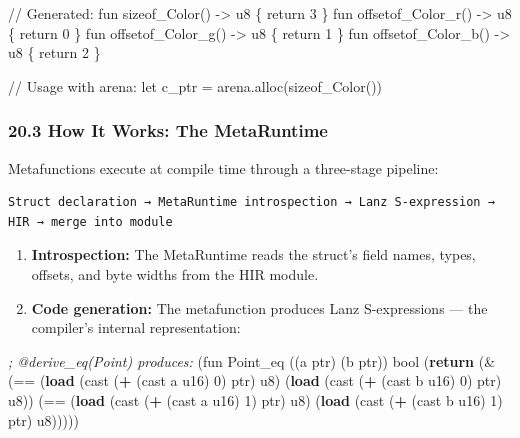 \documentclass[
  11pt,
]{article}
\newenvironment{Shaded}{\begin{snugshade}}{\end{snugshade}}
\newcommand{\CommentTok}[1]{\textcolor[rgb]{0.56,0.35,0.01}{\textit{#1}}}
\newcommand{\DecValTok}[1]{\textcolor[rgb]{0.00,0.00,0.81}{#1}}
\newcommand{\KeywordTok}[1]{\textcolor[rgb]{0.13,0.29,0.53}{\textbf{#1}}}
\newcommand{\NormalTok}[1]{#1}
\newcommand{\OperatorTok}[1]{\textcolor[rgb]{0.81,0.36,0.00}{\textbf{#1}}}
\begin{document}
\begin{Shaded}
\begin{Highlighting}[]
\NormalTok{// Generated:}
\NormalTok{fun sizeof\_Color() {-}\textgreater{} u8 \{ return 3 \}}
\NormalTok{fun offsetof\_Color\_r() {-}\textgreater{} u8 \{ return 0 \}}
\NormalTok{fun offsetof\_Color\_g() {-}\textgreater{} u8 \{ return 1 \}}
\NormalTok{fun offsetof\_Color\_b() {-}\textgreater{} u8 \{ return 2 \}}

\NormalTok{// Usage with arena:}
\NormalTok{let c\_ptr = arena.alloc(sizeof\_Color())}
\end{Highlighting}
\end{Shaded}

\hypertarget{how-it-works-the-metaruntime}{%
\subsubsection{20.3 How It Works: The
MetaRuntime}\label{how-it-works-the-metaruntime}}

Metafunctions execute at compile time through a three-stage pipeline:

\begin{verbatim}
Struct declaration → MetaRuntime introspection → Lanz S-expression → HIR → merge into module
\end{verbatim}

\begin{enumerate}
\def\labelenumi{\arabic{enumi}.}
\item
  \textbf{Introspection:} The MetaRuntime reads the struct's field
  names, types, offsets, and byte widths from the HIR module.
\item
  \textbf{Code generation:} The metafunction produces Lanz S-expressions
  --- the compiler's internal representation:
\end{enumerate}

\begin{Shaded}
\begin{Highlighting}[]
\CommentTok{; @derive\_eq(Point) produces:}
\NormalTok{(fun Point\_eq ((a ptr) (b ptr)) bool}
\NormalTok{  (}\KeywordTok{return}\NormalTok{ (\& (== (}\KeywordTok{load}\NormalTok{ (cast (}\OperatorTok{+}\NormalTok{ (cast a u16) }\DecValTok{0}\NormalTok{) ptr) u8)}
\NormalTok{                 (}\KeywordTok{load}\NormalTok{ (cast (}\OperatorTok{+}\NormalTok{ (cast b u16) }\DecValTok{0}\NormalTok{) ptr) u8))}
\NormalTok{             (== (}\KeywordTok{load}\NormalTok{ (cast (}\OperatorTok{+}\NormalTok{ (cast a u16) }\DecValTok{1}\NormalTok{) ptr) u8)}
\NormalTok{                 (}\KeywordTok{load}\NormalTok{ (cast (}\OperatorTok{+}\NormalTok{ (cast b u16) }\DecValTok{1}\NormalTok{) ptr) u8)))))}
\end{Highlighting}
\end{Shaded}
\end{document}
